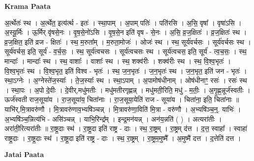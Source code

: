 \documentclass[17pt]{extarticle}
\begin{document}
\textbf{Krama Paata} \newline

अ॒र्त्थेतः॑ स्थ । अ॒र्त्थेत॒ इत्य॑र्त्थ - इतः॑ । स्था॒पाम् । अ॒पाम् पतिः॑ । पति॑रसि । अ॒सि॒ वृषा᳚ । वृषा॑ऽसि । अ॒स्यू॒र्मिः । ऊ॒र्मिर् वृ॑षसे॒नः । वृ॒ष॒से॒नो॑ऽसि । वृ॒ष॒से॒न इति॑ वृष - से॒नः । अ॒सि॒ व्र॒ज॒क्षितः॑ । व्र॒ज॒क्षितः॑ स्थ । व्र॒ज॒क्षित॒ इति॑ व्रज - क्षितः॑ । स्थ॒ म॒रुता᳚म् । म॒रुता॒मोजः॑ । ओजः॑ स्थ । स्थ॒ सूर्य॑वर्चसः । सूर्य॑वर्चसः स्थ । सूर्य॑वर्चस॒ इति॒ सूर्य॑ - व॒र्च॒सः॒ । स्थ॒ सूर्य॑त्वचसः । सूर्य॑त्वचसः स्थ । सूर्य॑त्वचस॒ इति॒ सूर्य॑ - त्व॒च॒सः॒ । स्थ॒ मान्दाः᳚ । मान्दाः᳚ स्थ । स्थ॒ वाशाः᳚ । वाशाः᳚ स्थ । स्थ॒ शक्व॑रीः । शक्व॑रीः स्थ । स्थ॒ वि॒श्व॒भृतः॑ । वि॒श्व॒भृतः॑ स्थ । वि॒श्व॒भृत॒ इति॑ विश्व - भृतः॑ । स्थ॒ ज॒न॒भृतः॑ । ज॒न॒भृतः॑ स्थ । ज॒न॒भृत॒ इति॑ जन - भृतः॑ । स्था॒ऽग्नेः । अ॒ग्नेस्ते॑ज॒स्याः᳚ । ते॒ज॒स्याः᳚ स्थ । स्था॒ऽपाम् । अ॒पामोष॑धीनाम् । ओष॑धीनाꣳ॒॒ रसः॑ । रसः॑ स्थ । स्था॒पः । अ॒पो दे॒वीः । दे॒वीर्,मधु॑मतीः । मधु॑मतीरगृह्णन्न् । मधु॑मती॒रिति॒ मधु॑ - म॒तीः॒ । अ॒गृ॒ह्ण॒न्नूर्ज॑स्वतीः । ऊर्ज॑स्वती राज॒सूया॑य । रा॒ज॒सूया॑य॒ चिता॑नाः । रा॒ज॒सूया॒येति॑ राज - सूया॑य । चिता॑ना॒ इति॒ चिता॑नाः ॥ याभि॑र्,मि॒त्रावरु॑णौ । मि॒त्रावरु॑णाव॒भ्यषि॑ञ्चन्न् । मि॒त्रावरु॑णा॒विति॑ मि॒त्रा - वरु॑णौ । अ॒भ्यषि॑ञ्च॒न्॒. याभिः॑ । अ॒भ्यषि॑ञ्च॒न्नित्य॑भि - असि॑ञ्चन्न् । याभि॒रिन्द्र᳚म् । इन्द्र॒मन॑यन्न् । अन॑य॒न्नति॑ ( ) । अत्यरा॑तीः । अरा॑ती॒रित्यरा॑तीः ॥ रा॒ष्ट्र॒दाः स्थ॑ । रा॒ष्ट्र॒दा इति॑ राष्ट्र - दाः । स्थ॒ रा॒ष्ट्रम् । रा॒ष्ट्रम् द॑त्त । द॒त्त॒ स्वाहा᳚ । स्वाहा॑ राष्ट्र॒दाः । रा॒ष्ट्र॒दाः स्थ॑ । रा॒ष्ट्र॒दा इति॑ राष्ट्र - दाः । स्थ॒ रा॒ष्ट्रम् । रा॒ष्ट्रम॒मुष्मै᳚ । अ॒मुष्मै॑ दत्त । द॒त्तेति॑ दत्त । \newline

\textbf{Jatai Paata} \newline
\end{document}
